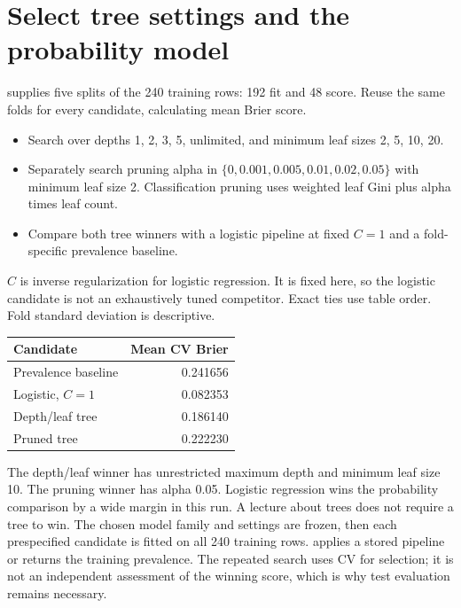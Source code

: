 \section{Select tree settings and the probability model}
 supplies five splits of the 240 training rows: 192 fit and 48 score. Reuse the same folds for every candidate, calculating mean Brier score.
\begin{itemize}
\item Search  over depths 1, 2, 3, 5, unlimited, and minimum leaf sizes 2, 5, 10, 20.
\item Separately search pruning alpha in $\{0,0.001,0.005,0.01,0.02,0.05\}$ with minimum leaf size 2. Classification pruning uses weighted leaf Gini plus alpha times leaf count.
\item Compare both tree winners with a logistic pipeline at fixed $C=1$ and a fold-specific prevalence baseline.
\end{itemize}
$C$ is inverse regularization for logistic regression. It is fixed here, so the logistic candidate is not an exhaustively tuned competitor. Exact ties use table order. Fold standard deviation is descriptive.
\begin{center}
\begin{tabular}{lr}\toprule
Candidate&Mean CV Brier\\\midrule
Prevalence baseline&0.241656\\
Logistic, $C=1$&0.082353\\
Depth/leaf tree&0.186140\\
Pruned tree&0.222230\\\bottomrule
\end{tabular}
\end{center}
The depth/leaf winner has unrestricted maximum depth and minimum leaf size 10. The pruning winner has alpha 0.05. Logistic regression wins the probability comparison by a wide margin in this run. A lecture about trees does not require a tree to win.
The chosen model family and settings are frozen, then each prespecified candidate is fitted on all 240 training rows.  applies a stored pipeline or returns the training prevalence. The repeated search uses CV for selection; it is not an independent assessment of the winning score, which is why test evaluation remains necessary.

